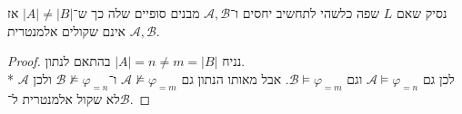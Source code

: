 \subquestion{}
נסיק שאם $L$ שפה כלשהי לתחשיב יחסים ו־$\mathcal{A, B}$ מבנים סופיים שלה כך ש־$|A| \ne |B|$ אז $\mathcal{A, B}$ אינם שקולים אלמנטרית.
\begin{proof}
	נניח $|A| = n \ne m = |B|$ בהתאם לנתון. \\*
	לכן גם $\mathcal{A} \models \varphi_{= n}$ וגם $\mathcal{B} \models \varphi_{= m}$.
	אבל מאותו הנתון גם $\mathcal{A} \not\models \varphi_{= m}$ ו־$\mathcal{B} \not\models \varphi_{= n}$ ולכן $\mathcal{A}$ לא שקול אלמנטרית ל־$\mathcal{B}$.
\end{proof}


